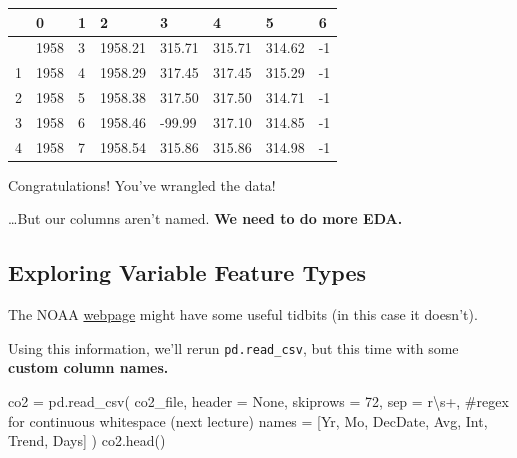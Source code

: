 \documentclass[
  letterpaper,
  DIV=11,
  numbers=noendperiod]{scrreprt}
\newenvironment{Shaded}{\begin{snugshade}}{\end{snugshade}}
\newcommand{\CommentTok}[1]{\textcolor[rgb]{0.37,0.37,0.37}{#1}}
\newcommand{\DecValTok}[1]{\textcolor[rgb]{0.68,0.00,0.00}{#1}}
\newcommand{\NormalTok}[1]{\textcolor[rgb]{0.00,0.23,0.31}{#1}}
\newcommand{\OperatorTok}[1]{\textcolor[rgb]{0.37,0.37,0.37}{#1}}
\newcommand{\StringTok}[1]{\textcolor[rgb]{0.13,0.47,0.30}{#1}}
\newcommand{\VariableTok}[1]{\textcolor[rgb]{0.07,0.07,0.07}{#1}}
\newcommand{\VerbatimStringTok}[1]{\textcolor[rgb]{0.13,0.47,0.30}{#1}}
\begin{document}
\begin{longtable}[]{@{}llllllll@{}}
\toprule\noalign{}
& 0 & 1 & 2 & 3 & 4 & 5 & 6 \\
\midrule\noalign{}
\endhead
\bottomrule\noalign{}
\endlastfoot
0 & 1958 & 3 & 1958.21 & 315.71 & 315.71 & 314.62 & -1 \\
1 & 1958 & 4 & 1958.29 & 317.45 & 317.45 & 315.29 & -1 \\
2 & 1958 & 5 & 1958.38 & 317.50 & 317.50 & 314.71 & -1 \\
3 & 1958 & 6 & 1958.46 & -99.99 & 317.10 & 314.85 & -1 \\
4 & 1958 & 7 & 1958.54 & 315.86 & 315.86 & 314.98 & -1 \\
\end{longtable}

Congratulations! You've wrangled the data!

\ldots But our columns aren't named. \textbf{We need to do more EDA.}

\subsection{Exploring Variable Feature
Types}\label{exploring-variable-feature-types}

The NOAA \href{https://gml.noaa.gov/ccgg/trends/}{webpage} might have
some useful tidbits (in this case it doesn't).

Using this information, we'll rerun \texttt{pd.read\_csv}, but this time
with some \textbf{custom column names.}

\begin{Shaded}
\begin{Highlighting}[]
\NormalTok{co2 }\OperatorTok{=}\NormalTok{ pd.read\_csv(}
\NormalTok{    co2\_file, header }\OperatorTok{=} \VariableTok{None}\NormalTok{, skiprows }\OperatorTok{=} \DecValTok{72}\NormalTok{,}
\NormalTok{    sep }\OperatorTok{=} \VerbatimStringTok{r\textquotesingle{}\textbackslash{}s+\textquotesingle{}}\NormalTok{, }\CommentTok{\#regex for continuous whitespace (next lecture)}
\NormalTok{    names }\OperatorTok{=}\NormalTok{ [}\StringTok{\textquotesingle{}Yr\textquotesingle{}}\NormalTok{, }\StringTok{\textquotesingle{}Mo\textquotesingle{}}\NormalTok{, }\StringTok{\textquotesingle{}DecDate\textquotesingle{}}\NormalTok{, }\StringTok{\textquotesingle{}Avg\textquotesingle{}}\NormalTok{, }\StringTok{\textquotesingle{}Int\textquotesingle{}}\NormalTok{, }\StringTok{\textquotesingle{}Trend\textquotesingle{}}\NormalTok{, }\StringTok{\textquotesingle{}Days\textquotesingle{}}\NormalTok{]}
\NormalTok{)}
\NormalTok{co2.head()}
\end{Highlighting}
\end{Shaded}
\end{document}
